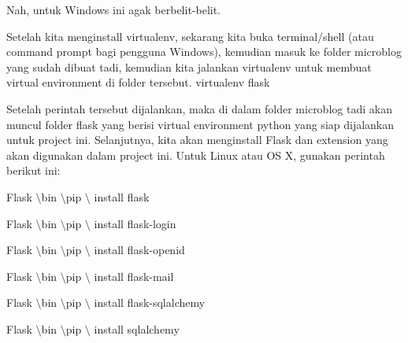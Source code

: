 \noindent 
{\fontsize{14pt}{14pt}\selectfont Nah, untuk Windows ini agak berbelit-belit. \\} \par
\noindent 
{\fontsize{14pt}{14pt}\selectfont Setelah kita menginstall virtualenv, sekarang kita buka terminal/shell (atau command prompt bagi pengguna Windows), kemudian masuk ke folder microblog yang sudah dibuat tadi, kemudian kita jalankan virtualenv untuk membuat virtual environment di folder tersebut.\vspace{\baselineskip}
virtualenv flask \\} \par
\noindent 
{\fontsize{14pt}{14pt}\selectfont Setelah perintah tersebut dijalankan, maka di dalam folder microblog tadi akan muncul folder flask yang berisi virtual environment python yang siap dijalankan untuk project ini. Selanjutnya, kita akan menginstall Flask dan extension yang akan digunakan dalam project ini. Untuk Linux atau OS X, gunakan perintah berikut ini: \\} \par
\vspace{14pt}
\noindent 
{\fontsize{14pt}{14pt}\selectfont Flask $  \setminus  $bin $  \setminus  $pip $  \setminus  $ install flask \\} \par
\vspace{14pt}
\noindent 
{\fontsize{14pt}{14pt}\selectfont Flask $  \setminus  $bin $  \setminus  $pip $  \setminus  $ install flask-login \\} \par
\vspace{14pt}
\noindent 
{\fontsize{14pt}{14pt}\selectfont Flask $  \setminus  $bin $  \setminus  $pip $  \setminus  $ install flask-openid \\} \par
\vspace{14pt}
\noindent 
{\fontsize{14pt}{14pt}\selectfont Flask $  \setminus  $bin $  \setminus  $pip $  \setminus  $ install flask-mail \\} \par
\vspace{14pt}
\noindent 
{\fontsize{14pt}{14pt}\selectfont Flask $  \setminus  $bin $  \setminus  $pip $  \setminus  $ install flask-sqlalchemy \\} \par
\vspace{14pt}
\noindent 
{\fontsize{14pt}{14pt}\selectfont Flask $  \setminus  $bin $  \setminus  $pip $  \setminus  $ install sqlalchemy \\} \par
